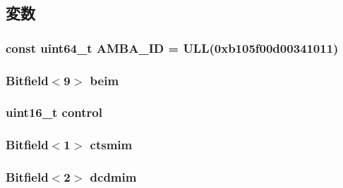 \subsection{変数}
\hypertarget{classPl011_ae438dff5177bb7a98567cd94061edab4}{
\subsubsection[{AMBA\_\-ID}]{\setlength{\rightskip}{0pt plus 5cm}const uint64\_\-t {\bf AMBA\_\-ID} = ULL(0xb105f00d00341011)}}
\label{classPl011_ae438dff5177bb7a98567cd94061edab4}
\hypertarget{classPl011_a8a3f2c2dd111d2dffbb1c54cbdc11e48}{
\subsubsection[{beim}]{\setlength{\rightskip}{0pt plus 5cm}Bitfield$<$9$>$ {\bf beim}}}
\label{classPl011_a8a3f2c2dd111d2dffbb1c54cbdc11e48}
\hypertarget{classPl011_a10e251ca482543ec4f81f4006b000aed}{
\subsubsection[{control}]{\setlength{\rightskip}{0pt plus 5cm}uint16\_\-t {\bf control}}}
\label{classPl011_a10e251ca482543ec4f81f4006b000aed}
\hypertarget{classPl011_ac6a6841bbd78ac1a329c8e1e6a6dd51b}{
\subsubsection[{ctsmim}]{\setlength{\rightskip}{0pt plus 5cm}Bitfield$<$1$>$ {\bf ctsmim}}}
\label{classPl011_ac6a6841bbd78ac1a329c8e1e6a6dd51b}
\hypertarget{classPl011_a40464feb8779903fa2eb809556b2c537}{
\subsubsection[{dcdmim}]{\setlength{\rightskip}{0pt plus 5cm}Bitfield$<$2$>$ {\bf dcdmim}}}

